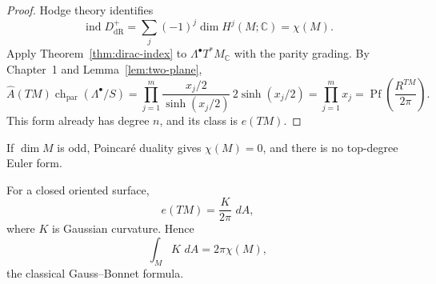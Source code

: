 \documentclass[11pt,oneside,reqno]{book}
\DeclareMathOperator{\ind}{ind}
\newcommand{\C}{\mathbb C}
\newcommand{\Ahat}{\widehat A}
\newcommand{\dd}{\,d}
\theoremstyle{plain}
\theoremstyle{definition}
\theoremstyle{remark}
\begin{document}
\begin{proof}
Hodge theory identifies
\[
 \ind D_{\mathrm{dR}}^+
 =
 \sum_j(-1)^j\dim H^j(M;\C)
 =
 \chi(M).
\]
Apply Theorem~\ref{thm:dirac-index} to \(\Lambda^\bullet T^*M_\C\) with the
parity grading.  By Chapter~1 and Lemma~\ref{lem:two-plane},
\[
 \Ahat(TM)\operatorname{ch}_{\mathrm{par}}(\Lambda^\bullet/S)
 =\prod_{j=1}^m\frac{x_j/2}{\sinh(x_j/2)}\,2\sinh(x_j/2)
 =\prod_{j=1}^mx_j
 =\operatorname{Pf}\!\left(\frac{R^{TM}}{2\pi}\right).
\]
This form already has degree \(n\), and its class is \(e(TM)\).
\end{proof}

If \(\dim M\) is odd, Poincaré duality gives \(\chi(M)=0\), and there is
no top-degree Euler form.

For a closed oriented surface,
\[
 e(TM)=\frac{K}{2\pi}\,\dd A,
\]
where \(K\) is Gaussian curvature. Hence
\[
 \int_MK\,\dd A=2\pi\chi(M),
\]
the classical Gauss--Bonnet formula.
\end{document}
